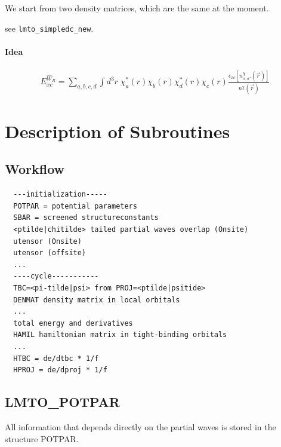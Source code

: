 \documentclass[11pt,a4paper]{report}
\begin{document}
We start from two density matrices, which are the same at the moment.

see \verb|lmto_simpledc_new|.




\subsubsection{Idea}
\begin{eqnarray}
E_{xc}^{\hat{W}_R}=\sum_{a,b,c,d}\int d^3r\; 
\chi^*_a(r)\chi_b(r)\chi^*_d(r)\chi_c(r)
\frac{\epsilon_{xc}[n^\chi_{\sigma,\sigma'}(\vec{r})]}
{n^\chi(\vec{r})}
\end{eqnarray}




\chapter{Description of Subroutines}
\section{Workflow}
\begin{verbatim}
  ---initialization----- 
  POTPAR = potential parameters 
  SBAR = screened structureconstants 
  <ptilde|chitilde> tailed partial waves overlap (Onsite) 
  utensor (Onsite) 
  utensor (offsite) 
  ...  
  ----cycle-----------
  TBC=<pi-tilde|psi> from PROJ=<ptilde|psitide> 
  DENMAT density matrix in local orbitals 
  ...  
  total energy and derivatives 
  HAMIL hamiltonian matrix in tight-binding orbitals 
  ...  
  HTBC = de/dtbc * 1/f 
  HPROJ = de/dproj * 1/f
\end{verbatim}

\section{LMTO\_POTPAR}
All information that depends directly on the partial waves is stored
in the structure POTPAR.
\end{document}
